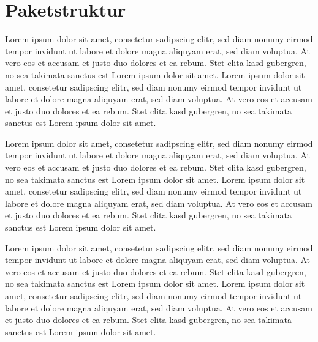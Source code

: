 \documentclass[11pt,a4paper]{report}
\begin{document}
\chapter{Paketstruktur} {

Lorem ipsum dolor sit amet, consetetur sadipscing elitr, sed diam nonumy eirmod tempor invidunt ut labore et dolore magna aliquyam erat, sed diam voluptua. At vero eos et accusam et justo duo dolores et ea rebum. Stet clita kasd gubergren, no sea takimata sanctus est Lorem ipsum dolor sit amet. Lorem ipsum dolor sit amet, consetetur sadipscing elitr, sed diam nonumy eirmod tempor invidunt ut labore et dolore magna aliquyam erat, sed diam voluptua. At vero eos et accusam et justo duo dolores et ea rebum. Stet clita kasd gubergren, no sea takimata sanctus est Lorem ipsum dolor sit amet.

Lorem ipsum dolor sit amet, consetetur sadipscing elitr, sed diam nonumy eirmod tempor invidunt ut labore et dolore magna aliquyam erat, sed diam voluptua. At vero eos et accusam et justo duo dolores et ea rebum. Stet clita kasd gubergren, no sea takimata sanctus est Lorem ipsum dolor sit amet. Lorem ipsum dolor sit amet, consetetur sadipscing elitr, sed diam nonumy eirmod tempor invidunt ut labore et dolore magna aliquyam erat, sed diam voluptua. At vero eos et accusam et justo duo dolores et ea rebum. Stet clita kasd gubergren, no sea takimata sanctus est Lorem ipsum dolor sit amet.

Lorem ipsum dolor sit amet, consetetur sadipscing elitr, sed diam nonumy eirmod tempor invidunt ut labore et dolore magna aliquyam erat, sed diam voluptua. At vero eos et accusam et justo duo dolores et ea rebum. Stet clita kasd gubergren, no sea takimata sanctus est Lorem ipsum dolor sit amet. Lorem ipsum dolor sit amet, consetetur sadipscing elitr, sed diam nonumy eirmod tempor invidunt ut labore et dolore magna aliquyam erat, sed diam voluptua. At vero eos et accusam et justo duo dolores et ea rebum. Stet clita kasd gubergren, no sea takimata sanctus est Lorem ipsum dolor sit amet.
}
\end{document}
